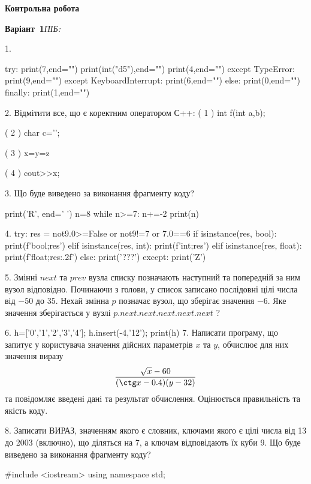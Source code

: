\documentclass[11pt]{article}
\begin{document}
{\large\textbf{Контрольна робота}}

\textbf{Варіант \No\,1}\hfill \textit{ПІБ:}\,\underline{\hspace{60mm}}
\vspace{4mm}

1. 

try:
    print(7,end="")
    print(int("d5"),end="")
    print(4,end="")
except TypeError: print(9,end="")
except KeyboardInterrupt: print(6,end="")
else: print(0,end="")
finally: print(1,end="")

2. %
Відмітити все, що є коректним оператором С++:
( 1 ) int f(int a,b);

( 2 ) char c='\n';

( 3 ) x=y=z

( 4 ) cout>>x;

3. Що буде виведено за виконання фрагменту коду?

print('R', end=' ')
n=8
while n>=7:
    n+=-2
print(n)


4. 
try:
    res = not9.0>=False or not9!=7 or 7.0==6
    if isinstance(res, bool):
        print(f'bool;{res}')
    elif isinstance(res, int):
        print(f'int;{res}')
    elif isinstance(res, float):
        print(f'float;{res:.2f}')
    else:
        print('???')
except:
    print('Z')

5. 
Змінні $next$ та $prev$ вузла списку позначають наступний та попередній за ним вузол відповідно. Починаючи з голови, у список записано послідовні цілі числа від $-50$ до $35$. Нехай змінна $p$ позначає вузол, що зберігає значення $-6$.
Яке значення зберігається у вузлі $p.next.next.next.next.next$ ?

6. 
h=['0','1','2','3','4']; h.insert(-4,'12'); print(h)
7. 
Написати програму, що запитує у користувача значення дійсних параметрів $x$ та $y$, обчислює для них значення виразу 
$$\frac{\sqrt x - 60}{(\ctg x - 0.4) (y - 32)}$$ 
та повiдомляє введенi данi та результат обчислення.
 Оцінюється правильність та якість коду.


8. 
Записати ВИРАЗ, значенням якого є словник, ключами якого є цілі числа від 13 до 2003 (включно), що діляться на 7, а ключам відповідають їх куби 
9. Що буде виведено за виконання фрагменту коду?

#include <iostream>
using namespace std;
\end{document}
